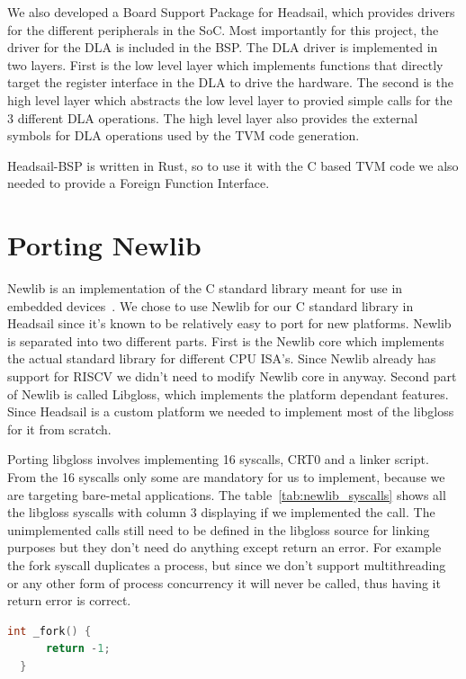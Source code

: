 \documentclass[12pt,a4paper,english
]{tunithesis}
\begin{document}
We also developed a Board Support Package for Headsail, which provides drivers for the different peripherals in the SoC. Most importantly for this project, the driver for the DLA is included in the BSP.
The DLA driver is implemented in two layers. First is the low level layer which implements functions that directly target the register interface in the DLA to drive the hardware. The second is the high level layer which abstracts the low level layer to provied simple calls for the 3 different DLA operations. The high level layer also provides the external symbols for DLA operations used by the TVM code generation.

Headsail-BSP is written in Rust, so to use it with the C based TVM code we also needed to provide a Foreign Function Interface.


\section{Porting Newlib}
Newlib is an implementation of the C standard library meant for use in embedded devices~\cite{newlib}. We chose to use Newlib for our C standard library in Headsail since it's known to be relatively easy to port for new platforms. Newlib is separated into two different parts. First is the Newlib core which implements the actual standard library for different CPU ISA's. Since Newlib already has support for RISCV we didn't need to modify Newlib core in anyway. Second part of Newlib is called Libgloss, which implements the platform dependant features. Since Headsail is a custom platform we needed to implement most of the libgloss for it from scratch.

Porting libgloss involves implementing 16 syscalls, CRT0 and a linker script. From the 16 syscalls only some are mandatory for us to implement, because we are targeting bare-metal applications. The table~\ref{tab:newlib_syscalls} shows all the libgloss syscalls with column 3 displaying if we implemented the call. The unimplemented calls still need to be defined in the libgloss source for linking purposes but they don't need do anything except return an error. For example the fork syscall duplicates a process, but since we don't support multithreading or any other form of process concurrency it will never be called, thus having it return error is correct.

\begin{lstlisting}[language=C, caption={Minimal implmentation of the fork() syscall in Newlib Libgloss}]
  int _fork() {
      return -1;
  }
\end{lstlisting}
\end{document}
